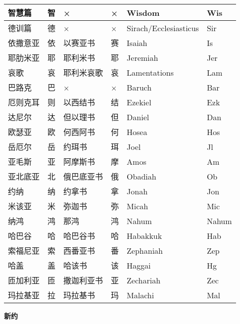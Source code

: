 {\begin{longtable}{|l|l|l|l|l|l|}
		智慧篇 & 智 & × & × & Wisdom & Wis \\
		\hline
		德训篇 & 德 & × & × & Sirach/Ecclesiasticus & Sir \\
		\hline
		依撒意亚 & 依 & 以赛亚书 & 赛 & Isaiah & Is \\
		\hline
		耶肋米亚 & 耶 & 耶利米书 & 耶 & Jeremiah & Jer \\
		\hline
		哀歌 & 哀 & 耶利米哀歌 & 哀 & Lamentations & Lam \\
		\hline
		巴路克 & 巴 & × & × & Baruch & Bar \\
		\hline
		厄则克耳 & 则 & 以西结书 & 结 & Ezekiel & Ezk \\
		\hline
		达尼尔 & 达 & 但以理书 & 但 & Daniel & Dan \\
		\hline
		欧瑟亚 & 欧 & 何西阿书 & 何 & Hosea & Hos \\
		\hline
		岳厄尔 & 岳 & 约珥书 & 珥 & Joel & Jl \\
		\hline
		亚毛斯 & 亚 & 阿摩斯书 & 摩 & Amos & Am \\
		\hline
		亚北底亚 & 北 & 俄巴底亚书 & 俄 & Obadiah & Ob \\
		\hline
		约纳 & 纳 & 约拿书 & 拿 & Jonah & Jon \\
		\hline
		米该亚 & 米 & 弥迦书 & 弥 & Micah & Mic \\
		\hline
		纳鸿 & 鸿 & 那鸿 & 鸿 & Nahum & Nahum \\
		\hline
		哈巴谷 & 哈 & 哈巴谷书 & 哈 & Habakkuk & Hab \\
		\hline
		索福尼亚 & 索 & 西番亚书 & 番 & Zephaniah & Zep \\
		\hline
		哈盖 & 盖 & 哈该书 & 该 & Haggai & Hg \\
		\hline
		匝加利亚 & 匝 & 撒迦利亚书 & 亚 & Zechariah & Zec \\
		\hline
		玛拉基亚 & 拉 & 玛拉基书 & 玛 & Malachi & Mal \\
		\hline
		
	\end{longtable} 
	
}

\newpage

\begin{center}
	\textbf{新约}
\end{center}

